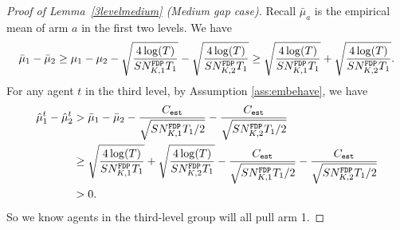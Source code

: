 \begin{proof}[Proof of Lemma~\ref{3levelmedium} (Medium gap case)]
  Recall $\bar{\mu}_a$ is
  the empirical mean of arm $a$ in the first two levels. We have
\[
\bar{\mu}_1 - \bar{\mu}_2 \geq \mu_1 -\mu_2 - \sqrt{\frac{4\log(T)}{S\fdpN[1]T_1}} - \sqrt{\frac{4\log(T)}{S\fdpN[2]T_1}} \geq  \sqrt{\frac{4\log(T)}{S\fdpN[1]T_1}}
+ \sqrt{\frac{4\log(T)}{S\fdpN[2]T_1}}.
\]
For any agent $t$ in the third level, by Assumption \ref{ass:embehave}, we have
\begin{align*}
\hat{\mu}_1^t - \hat{\mu}_2^t &>\bar{\mu}_1 - \bar{\mu}_2 - \frac{\estC}{\sqrt{S\fdpN[1]T_1/2}} - \frac{\estC}{\sqrt{S\fdpN[2]T_1/2}}\\
&\geq  \sqrt{\frac{4\log(T)}{S\fdpN[1]T_1}} + \sqrt{\frac{4\log(T)}{S\fdpN[2]T_1}}- \frac{\estC}{\sqrt{S\fdpN[1]T_1/2}} - \frac{\estC}{\sqrt{S\fdpN[2]T_1/2}}\\
 &> 0.
\end{align*}
So we know agents in the third-level group will all pull arm 1. 
\end{proof}


